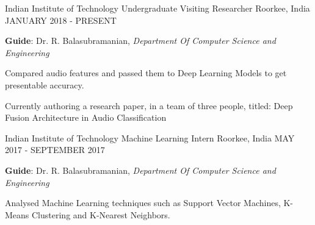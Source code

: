 \begin{cventries}
  \cventry
    {Indian Institute of Technology}
    {Undergraduate Visiting Researcher}
    {Roorkee, India}
    {JANUARY 2018 - PRESENT}
    {
      \begin{cvitems}
        \item {\textbf{Guide}: Dr. R. Balasubramanian, 
        \textit{Department Of Computer Science and Engineering}}
        \item {Compared audio features and passed them to Deep Learning Models to get presentable accuracy.}
        \item {Currently authoring a research paper, in a team of three people, titled:
        Deep Fusion Architecture in Audio Classification}
      \end{cvitems}
    }
  \cventry
    {Indian Institute of Technology}
    {Machine Learning Intern}
    {Roorkee, India}
    {MAY 2017 - SEPTEMBER 2017}
    {
      \begin{cvitems}
        \item {\textbf{Guide}: Dr. R. Balasubramanian, 
        \textit{Department Of Computer Science and Engineering}}
        \item {Analysed Machine Learning techniques such as Support Vector Machines,
        K-Means Clustering and K-Nearest Neighbors.}
      \end{cvitems}
    }
\end{cventries}
